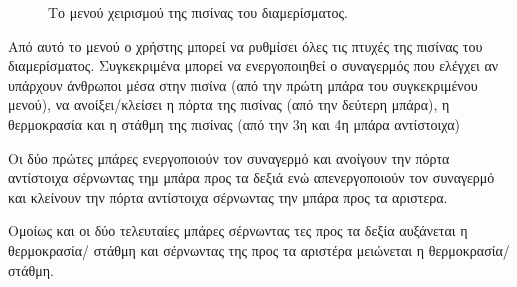 \documentclass[a4paper,titlepage,twoside,12pt,leqno]{article}
\begin{document}
\begin{figure}
\begin{center}
\caption{Το μενού χειρισμού της πισίνας του διαμερίσματος.}
\label{fig:menu:pool}
\end{center}
\end{figure}

Από αυτό το μενού ο χρήστης μπορεί να ρυθμίσει όλες τις πτυχές της πισίνας του διαμερίσματος. Συγκεκριμένα μπορεί να ενεργοποιηθεί ο συναγερμός που ελέγχει αν υπάρχουν άνθρωποι μέσα στην πισίνα (από την πρώτη μπάρα του συγκεκριμένου μενού), να ανοίξει/κλείσει η πόρτα της πισίνας (από την δεύτερη μπάρα), η θερμοκρασία και η στάθμη της πισίνας (από την 3η και 4η μπάρα αντίστοιχα)

Οι δύο πρώτες μπάρες ενεργοποιούν τον συναγερμό και ανοίγουν την πόρτα αντίστοιχα σέρνωντας τημ μπάρα προς τα δεξιά ενώ απενεργοποιούν τον συναγερμό και κλείνουν την πόρτα αντίστοιχα σέρνωντας την μπάρα προς τα αριστερα.

Ομοίως και οι δύο τελευταίες μπάρες σέρνωντας τες προς τα δεξία αυξάνεται η θερμοκρασία/ στάθμη και σέρνωντας της προς τα αριστέρα μειώνεται η θερμοκρασία/στάθμη.

\end{document}
